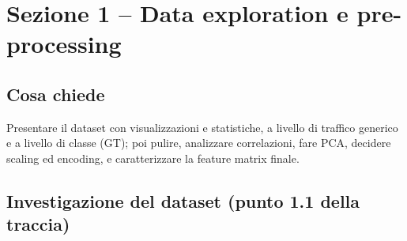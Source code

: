 \section{Sezione 1 -- Data exploration e pre-processing}

\subsection{Cosa chiede}
Presentare il dataset con visualizzazioni e statistiche, a livello di traffico
generico e a livello di classe (GT); poi pulire, analizzare correlazioni, fare
PCA, decidere scaling ed encoding, e caratterizzare la feature matrix finale.

\subsection{Investigazione del dataset (punto 1.1 della traccia)}

